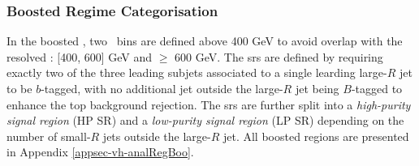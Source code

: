 \subsubsection{Boosted Regime Categorisation}
In the boosted \vhb, two \ptv\ bins are defined above 400 GeV to avoid overlap with the resolved \vhb: [400, 600] GeV and $\geq$ 600 GeV. The \gls{sr}s are defined by requiring exactly two of the three leading subjets associated to a single learding large-$R$ jet to be $b$-tagged, with no additional jet outside the large-$R$ jet being $B$-tagged to enhance the top background rejection. The \gls{sr}s are further split into a \textit{high-purity signal region} (HP SR) and a \textit{low-purity signal region} (LP SR) depending on the number of small-$R$ jets outside the large-$R$ jet. All boosted regions are presented in Appendix \ref{appsec-vh-analRegBoo}. 

